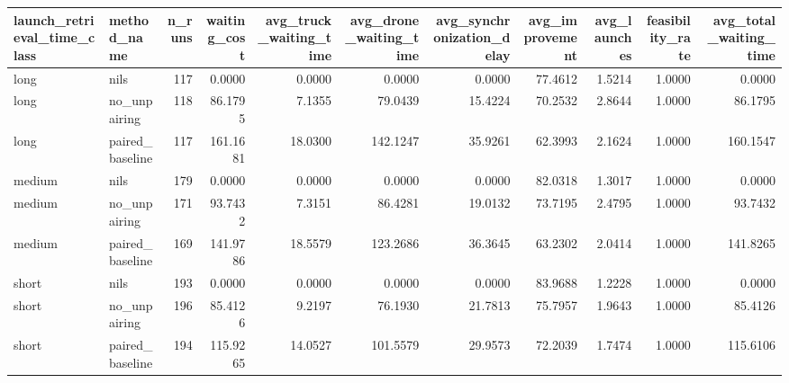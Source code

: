 \begin{tabular}{llrrrrrrrrr}
\toprule
launch_retrieval_time_class & method_name & n_runs & waiting_cost & avg_truck_waiting_time & avg_drone_waiting_time & avg_synchronization_delay & avg_improvement & avg_launches & feasibility_rate & avg_total_waiting_time \\
\midrule
long & nils & 117 & 0.0000 & 0.0000 & 0.0000 & 0.0000 & 77.4612 & 1.5214 & 1.0000 & 0.0000 \\
long & no_unpairing & 118 & 86.1795 & 7.1355 & 79.0439 & 15.4224 & 70.2532 & 2.8644 & 1.0000 & 86.1795 \\
long & paired_baseline & 117 & 161.1681 & 18.0300 & 142.1247 & 35.9261 & 62.3993 & 2.1624 & 1.0000 & 160.1547 \\
medium & nils & 179 & 0.0000 & 0.0000 & 0.0000 & 0.0000 & 82.0318 & 1.3017 & 1.0000 & 0.0000 \\
medium & no_unpairing & 171 & 93.7432 & 7.3151 & 86.4281 & 19.0132 & 73.7195 & 2.4795 & 1.0000 & 93.7432 \\
medium & paired_baseline & 169 & 141.9786 & 18.5579 & 123.2686 & 36.3645 & 63.2302 & 2.0414 & 1.0000 & 141.8265 \\
short & nils & 193 & 0.0000 & 0.0000 & 0.0000 & 0.0000 & 83.9688 & 1.2228 & 1.0000 & 0.0000 \\
short & no_unpairing & 196 & 85.4126 & 9.2197 & 76.1930 & 21.7813 & 75.7957 & 1.9643 & 1.0000 & 85.4126 \\
short & paired_baseline & 194 & 115.9265 & 14.0527 & 101.5579 & 29.9573 & 72.2039 & 1.7474 & 1.0000 & 115.6106 \\
\bottomrule
\end{tabular}
